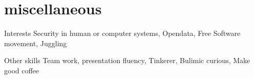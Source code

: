 \documentclass[]{friggeri-cv} %
\begin{document}

\section{miscellaneous}

\begin{entrylist}
\entry
{Interests}{}{}
{Security in human or computer systems, Opendata, Free Software movement, Juggling}

\entry
{Other skills}{}{}
{Team work, presentation fluency, Tinkerer, Bulimic curious, Make good coffee}

\end{entrylist}
\end{document}
